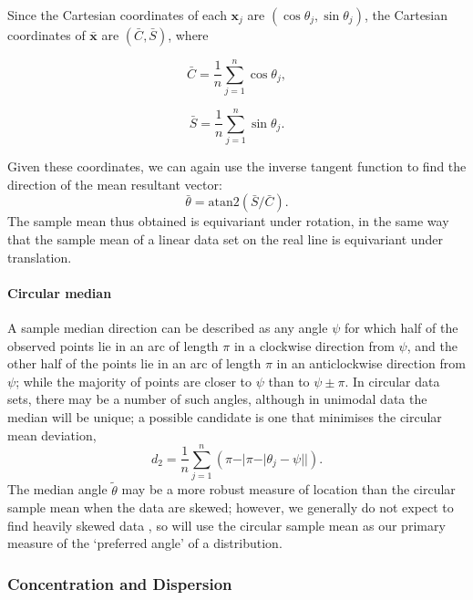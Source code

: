 \documentclass[../../ArchStats.tex]{subfiles}
\begin{document}
Since the Cartesian coordinates of each $\mathbf{x}_j$ are $(\cos\theta_j, \sin\theta_j)$, the Cartesian coordinates of $\mathbf{\bar{x}}$ are $(\bar{C}, \bar{S})$, where
	\begin{minipage}{0.5\linewidth}
	\[\bar{C} = \frac{1}{n} \sum_{j=1}^{n} \cos \theta_j,\]
	\end{minipage}
	\hspace{0.5cm}
	\begin{minipage}{0.5\linewidth}
	\[\bar{S} = \frac{1}{n} \sum_{j=1}^{n} \sin \theta_j.\]
	\end{minipage}
Given these coordinates, we can again use the inverse tangent function to find the direction of the mean resultant vector: 
\[\bar{\theta} = \text{atan2}(\bar{S}/\bar{C}).\]
 The sample mean thus obtained is equivariant under rotation, in the same way that the sample mean of a linear data set on the real line is equivariant under translation.


\paragraph{Circular median \\} 

A sample median direction can be described as any angle $\psi$ for which half of the observed points lie in an arc of length $\pi$ in a clockwise direction from $\psi$, and the other half of the points lie in an arc of length $\pi$ in an anticlockwise direction from $\psi$; while the majority of points are closer to $\psi$ than to $\psi \pm \pi$.  In circular data sets, there may be a number of such angles, although in unimodal data the median will be unique; a possible candidate is one that minimises the circular mean deviation,
\[d_2 = \frac{1}{n} \sum_{j=1}^n \left( \pi - \vert \pi - \vert \theta_j - \psi \vert \vert \right).\]
The median angle $\tilde{\theta}$ may be a more robust measure of location than the circular sample mean when the data are skewed; however, we generally do not expect to find heavily skewed data , so will use the circular sample mean as our primary measure of the `preferred angle' of a distribution.


\subsubsection{Concentration and Dispersion}
\end{document}

